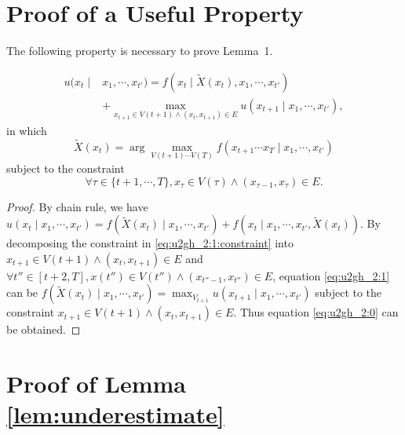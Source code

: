 \appendices 
\section{Proof of a Useful Property}
\label{app:prop:u2gh_2}
The following property is necessary to prove Lemma~1.

\begin{propty}
\label{prop:u2gh_2}
\begin{equation}
\label{eq:u2gh_2:0}
\begin{aligned}
u( x_{t} \mid & x_{1} , \cdots , x_{t'} ) = f( x_{t} \mid \tilde{X}(x_{t}), x_{1} , \cdots , x_{t'} ) \\
& + \max_{x_{t+1} \in V(t+1) \land ( x_{t}, x_{t+1} ) \in E} u( x_{t+1} \mid x_{1} , \cdots , x_{t'} ),
\end{aligned}
\end{equation}
in which
\begin{equation}
\label{eq:u2gh_2:1}
\tilde{X}(x_{t}) = \arg \max_{ V(t+1) \cdots V(T) } f( x_{t+1} \cdots x_{T} \mid x_{1} , \cdots , x_{t'} )
\end{equation}
subject to the constraint
\begin{equation}
\label{eq:u2gh_2:1:constraint}
\forall \tau \in \{ t+1 , \cdots , T \},  x_{ \tau } \in V( \tau ) \land ( x_{ \tau-1 }, x_{ \tau } ) \in E .
\end{equation}

\begin{proof}
By chain rule, we have
$ u(x_{t} \mid x_{1} , \cdots , x_{t'} ) = f( \tilde{X}(x_{t}) \mid x_{1}, \cdots , x_{t'}) + f(x_{t} \mid x_{1}, \cdots , x_{t'}, \tilde{X}(x_{t})) $.
By decomposing the constraint in \eqref{eq:u2gh_2:1:constraint} into
$ x_{t+1} \in V(t+1) \land ( x_{t}, x_{t+1} ) \in E $
and
$ \forall t'' \in [t+2, T], x(t'') \in V(t'') \land ( x_{t''-1}, x_{t''} ) \in E $, equation \eqref{eq:u2gh_2:1} can be 
$ f( \tilde{X}(x_{t}) \mid x_{1}, \cdots , x_{t'}) = 
\max_{V_{t+1}} u( x_{t+1} \mid x_{1} , \cdots , x_{t'} ) $
subject to the constraint $ x_{t+1} \in V(t+1) \land ( x_{t}, x_{t+1} ) \in E $.
Thus equation \eqref{eq:u2gh_2:0} can be obtained. 


\end{proof}

\end{propty}
\section{ Proof of Lemma \ref{lem:underestimate} }
\label{app:lemma_under}

